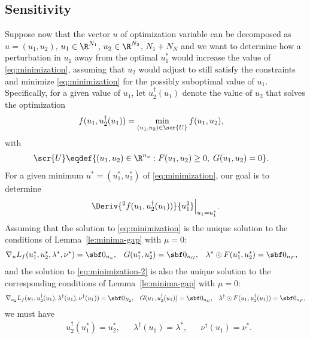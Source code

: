 \documentclass[11pt]{article}
\begin{document}
\subsection{Sensitivity}

Suppose now that the vector $u$ of optimization variable can be
decomposed as $u=(u_1,u_2)$, $u_1\in\R^{N_1}$, $u_2\in\R^{N_2}$,
$N_1+N_N$ and we want to determine how a perturbation in $u_1$ away
from the optimal $u_1^*$ would increase the value of
\eqref{eq:minimization}, assuming that $u_2$ would adjust to still
satisfy the constraints and minimize \eqref{eq:minimization} for the
possibly suboptimal value of $u_1$.
%
Specifically, for a given value of $u_1$, let $u_2^\dagger(u_1)$ denote
the value of $u_2$ that solves the optimization
\begin{align}\label{eq:minimization-2}
  f(u_1,u_2^\dagger(u_1))&=\min_{(u_1,u_2)\in\scr{U}} f(u_1,u_2), &
\end{align}
with
\begin{align*}
  \scr{U}&\eqdef\{(u_1,u_2)\in\R^{n_u}: F(u_1,u_2)\ge 0,\; G(u_1,u_2)=0\}.
\end{align*}
For a given minimum $u^*=(u_1^*,u_2^*)$ of \eqref{eq:minimization}, our
goal is to determine
\begin{align*}
  \Deriv{^2f(u_1,u_2^\dagger(u_1))}{u_1^2}\Big|_{u_1=u_1^*}.
\end{align*}
Assuming that the solution to \eqref{eq:minimization} is the unique
solution to the conditions of Lemma~\ref{le:minima-gap} with $\mu=0$:
\begin{align}\label{eq:u-star}
  &\nabla_u L_f(u_1^*,u_2^*,\lambda^*,\nu^*)=\sbf 0_{n_u}, &
  &G(u_1^*,u_2^*)=\sbf 0 _{n_G}, &
  &\lambda^*\odot F(u_1^*,u_2^*)=\sbf 0_{n_F}, &
\end{align}
and the solution to \eqref{eq:minimization-2} is also the unique
solution to the corresponding conditions of Lemma~\ref{le:minima-gap}
with $\mu=0$:
  \begin{align}\label{eq:u-dagger}
  &\nabla_{u_2} L_f(u_1,u_2^\dagger(u_1),\lambda^\dagger(u_1),\nu^\dagger(u_1))=\sbf 0_{N_2}, &
  &G(u_1,u_2^\dagger(u_1))=\sbf 0 _{n_G}, 
  &\lambda^\dagger\odot F(u_1,u_2^\dagger(u_1))=\sbf 0_{n_F}, 
\end{align}
we must have
\begin{align*}
  &u_2^\dagger(u_1^*)=u_2^*, &
  &\lambda^\dagger(u_1)=\lambda^*, &
  &\nu^\dagger(u_1)=\nu^*.
\end{align*}
\end{document}
